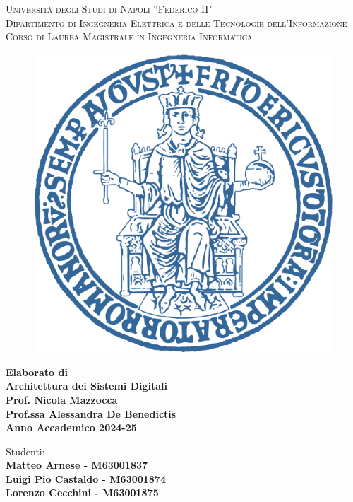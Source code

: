 \begin{titlepage}
    \begin{center}
        {\Large \textsc{Università degli Studi di Napoli ``Federico II"}}\\
        \bigskip
        {\large \textsc{Dipartimento di Ingegneria Elettrica e delle Tecnologie dell'Informazione}}\\
        \bigskip
        {\large \textsc{Corso di Laurea Magistrale in Ingegneria Informatica}}\\
        \bigskip
        \begin{figure}[h]
            \centering
            \includegraphics[width=0.5\linewidth]{img/unina_logo.png}
            \label{fig:unina_logo}
        \end{figure}
        \bigskip
        {\Large \textbf{Elaborato di}}\\
        \medskip
        {\Huge \textbf{Architettura dei Sistemi Digitali}}\\
        \smallskip
        {\large \textbf{Prof. Nicola Mazzocca}}\\
        {\large \textbf{Prof.ssa Alessandra De Benedictis}}\\
        \smallskip
        {\textbf{Anno Accademico 2024-25}}\\
        \vfill
    \end{center}
    \begin{flushright}
        {\large Studenti:}\\
        \smallskip
        {\large \textbf{Matteo Arnese - M63001837}}\\
        {\large \textbf{Luigi Pio Castaldo - M63001874}}\\
        {\large \textbf{Lorenzo Cecchini - M63001875}}
    \end{flushright}
\end{titlepage}
